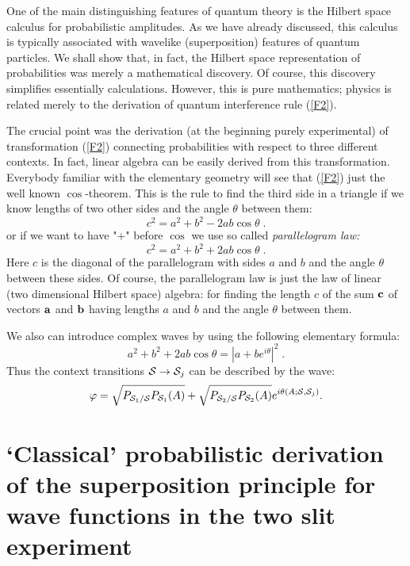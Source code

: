 \documentclass[12pt,oneside,final,a4paper]{article}
\begin{document}
One of the main distinguishing features of quantum theory
is the Hilbert space calculus for probabilistic amplitudes.
As we have already discussed, this calculus is typically associated
with wavelike (superposition) features of quantum particles.
We shall show that, in fact, the Hilbert space representation of
probabilities was merely a mathematical discovery. Of course, this discovery
simplifies essentially calculations. However, this is pure mathematics;
physics is related merely to the derivation of
quantum interference rule (\ref{F2}). 

The crucial point was 
the derivation (at the beginning purely experimental) of transformation (\ref{F2})
connecting probabilities with respect to three different contexts. In fact, linear algebra
can be easily derived from this transformation. Everybody familiar with the elementary geometry
will see that (\ref{F2}) just the well known $\cos$-theorem. This is the rule to find
the third side in a triangle  if we know
lengths of two other sides and the angle $\theta$ between them:
$$
c^2 =a^2 + b^2 - 2 ab \cos \theta\;.
$$
or if we want to have "+" before $\cos$ we use so called {\it parallelogram law:}
\begin{equation}
\label{P}
c^2 = a^2 + b^2 + 2 ab \cos \theta\;.
\end{equation}
Here $c$ is the diagonal of the parallelogram with sides $a$ and $b$ and the angle $\theta$
between these sides. Of course, the parallelogram law is  just the law of linear
(two dimensional Hilbert space) algebra: for finding the length $c$ of the sum ${\bf c}$
of vectors ${\bf a}$ and ${\bf b}$ having lengths $a$ and $b$ and the angle $\theta$ between them.

We also can introduce 
complex waves by using the following 
elementary formula: 
\begin{equation}
\label{TTT}
a^2 + b^2 + 2 ab \cos\theta=|a+ b e^{i\theta}|^2\; .
\end{equation}
Thus the context transitions 
${\cal S}\rightarrow {\cal S}_j$ can be described by the wave:
$$
\varphi=\sqrt{P_{{\cal S}_1/{\cal S}}  P_{{\cal S}_1}(A)} 
+ \sqrt{P_{{\cal S}_2/{\cal S}}  P_{{\cal S}_2}(A)}e^{i\theta(A; {\cal S}, {\cal S}_j)}.
$$


\section{`Classical' probabilistic derivation of the superposition
principle for wave functions in the two slit experiment}
\end{document}
